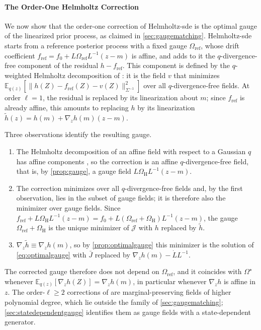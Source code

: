 \documentclass{article} %
\newcommand{\priordrift}{h}
\newcommand{\postdrift}{f}
\newcommand{\gauge}{\Omega}
\newcommand{\E}{\mathbb{E}}
\begin{document}
\paragraph{The Order-One Helmholtz Correction}
We now show that the order-one correction of Helmholtz-\gls{sde} \citep{smith2026closing} is the optimal gauge of the linearized prior process, as claimed in \cref{sec:gaugematching}. Helmholtz-\gls{sde} starts from a reference posterior process with a fixed gauge $\gauge_{\mathrm{ref}}$, whose drift coefficient $\postdrift_{\mathrm{ref}} = \postdrift_0 + L \gauge_{\mathrm{ref}} L^{-1}(z - m)$ is affine, and adds to it the $q$-divergence-free component of the residual $\priordrift - \postdrift_{\mathrm{ref}}$. This component is defined by the $q$-weighted Helmholtz decomposition of \citet{smith2026closing}: it is the field $v$ that minimizes $\E_{q(z)}[\| \priordrift(Z) - \postdrift_{\mathrm{ref}}(Z) - v(Z) \|_{\Sigma^{-1}}^2]$ over all $q$-divergence-free fields. At order $\ell = 1$, the residual is replaced by its linearization about $m$; since $\postdrift_{\mathrm{ref}}$ is already affine, this amounts to replacing $\priordrift$ by its linearization $\tilde\priordrift(z) = \priordrift(m) + \nabla_z \priordrift(m)(z - m)$.

Three observations identify the resulting gauge.
\begin{enumerate}[nosep,leftmargin=*]
    \item The Helmholtz decomposition of an affine field with respect to a Gaussian $q$ has affine components \citep{smith2026closing}, so the correction is an affine $q$-divergence-free field, that is, by \cref{prop:gauge}, a gauge field $L \gauge_{\mathrm{H}} L^{-1}(z - m)$.
    \item The correction minimizes over all $q$-divergence-free fields and, by the first observation, lies in the subset of gauge fields; it is therefore also the minimizer over gauge fields. Since $\postdrift_{\mathrm{ref}} + L \gauge_{\mathrm{H}} L^{-1}(z - m) = \postdrift_0 + L (\gauge_{\mathrm{ref}} + \gauge_{\mathrm{H}}) L^{-1}(z - m)$, the gauge $\gauge_{\mathrm{ref}} + \gauge_{\mathrm{H}}$ is the unique minimizer of $\mathcal{J}$ with $\priordrift$ replaced by $\tilde\priordrift$.
    \item $\nabla_z \tilde\priordrift \equiv \nabla_z \priordrift(m)$, so by \cref{prop:optimalgauge} this minimizer is the solution of \cref{eq:optimalgauge} with $\bar J$ replaced by $\nabla_z \priordrift(m) - \dot L L^{-1}$.
\end{enumerate}
The corrected gauge therefore does not depend on $\gauge_{\mathrm{ref}}$, and it coincides with $\gauge^\star$ whenever $\E_{q(z)}[\nabla_z \priordrift(Z)] = \nabla_z \priordrift(m)$, in particular whenever $\nabla_z \priordrift$ is affine in $z$. The order-$\ell \ge 2$ corrections of \citet{smith2026closing} are marginal-preserving fields of higher polynomial degree, which lie outside the family of \cref{sec:gaugematching}; \cref{sec:statedependentgauge} identifies them as gauge fields with a state-dependent generator.
\end{document}
